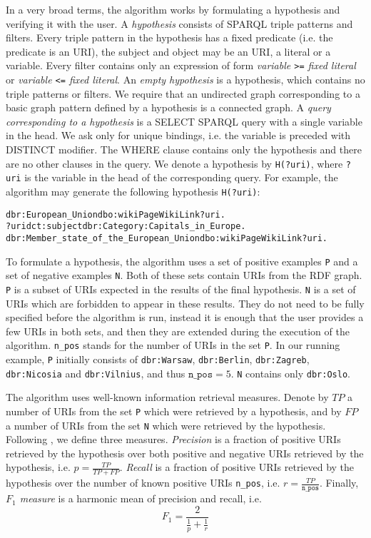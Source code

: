 \documentclass{llncs}
\begin{document}
In a very broad terms, the algorithm works by formulating a hypothesis and verifying it with the user.
A \emph{hypothesis} consists of SPARQL triple patterns and filters.
Every triple pattern in the hypothesis has a fixed predicate (i.e. the predicate is an URI), the subject and object may be an URI, a literal or a variable.
Every filter contains only an expression of form \emph{variable \texttt{>=} fixed literal} or \emph{variable \texttt{<=} fixed literal}.
An \emph{empty hypothesis} is a hypothesis, which contains no triple patterns or filters.
We require that an undirected graph corresponding to a basic graph pattern defined by a hypothesis is a connected graph.
A \emph{query corresponding to a hypothesis} is a SELECT SPARQL query with a single variable in the head.
We ask only for unique bindings, i.e. the variable is preceded with DISTINCT modifier.
The WHERE clause contains only the hypothesis and there are no other clauses in the query.
We denote a hypothesis by \texttt{H(?uri)}, where \texttt{?uri} is the variable in the head of the corresponding query.
For example, the algorithm may generate the following hypothesis \texttt{H(?uri)}:
\begin{alltt}
dbr:European_Union dbo:wikiPageWikiLink ?uri .
?uri dct:subject dbr:Category:Capitals_in_Europe .
dbr:Member_state_of_the_European_Union dbo:wikiPageWikiLink ?uri.
\end{alltt}

To formulate a hypothesis, the algorithm uses a set of positive examples \texttt{P} and a set of negative examples \texttt{N}.
Both of these sets contain URIs from the RDF graph.
\texttt{P} is a subset of URIs expected in the results of the final hypothesis.
\texttt{N} is a set of URIs which are forbidden to appear in these results.
They do not need to be fully specified before the algorithm is run, instead it is enough that the user provides a few URIs in both sets, and then they are extended during the execution of the algorithm.
\texttt{n\_pos} stands for the number of URIs in the set \texttt{P}.
In our running example, \texttt{P} initially consists of \texttt{dbr:Warsaw}, \texttt{dbr:Berlin}, \texttt{dbr:Zagreb}, \texttt{dbr:Nicosia} and \texttt{dbr:Vilnius}, and thus $\texttt{n\_pos}=5$.
\texttt{N} contains only \texttt{dbr:Oslo}.

The algorithm uses well-known information retrieval measures.
Denote by $TP$ a number of URIs from the set \texttt{P} which were retrieved by a hypothesis, and by $FP$ a number of URIs from the set \texttt{N} which were retrieved by the hypothesis.
Following \cite{mir2e}, we define three measures.
\emph{Precision} is a fraction of positive URIs retrieved by the hypothesis over both positive and negative URIs retrieved by the hypothesis, i.e. $p=\frac{TP}{TP+FP}$.
\emph{Recall} is a fraction of positive URIs retrieved by the hypothesis over the number of known positive URIs \texttt{n\_pos}, i.e. $r=\frac{TP}{\texttt{n\_pos}}$.
Finally, \emph{$F_1$ measure} is a harmonic mean of precision and recall, i.e. 
\[F_1 = \frac{2}{\frac{1}{p}+\frac{1}{r}}\]
\end{document}
